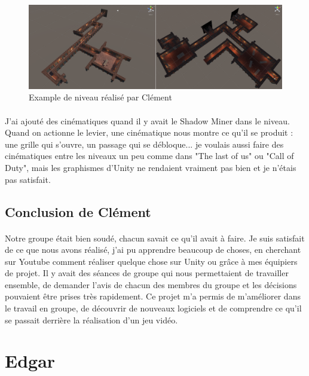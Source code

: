 \documentclass[titlepage, 13px, a4paper]{report}
\begin{document}
\begin{figure}[h!]
  \centering
  \includegraphics[scale=0.4]{images/clement_map_Final.png}
  \caption{Example de niveau réalisé par Clément}
\end{figure}

\paragraph*{} \hspace{0pt}
J'ai ajouté des cinématiques quand il y avait le Shadow Miner dans le niveau. 
Quand on actionne le levier, une cinématique nous montre ce qu'il se produit : une 
grille qui s'ouvre, un passage qui se débloque... je voulais aussi faire des cinématiques 
entre les niveaux un peu comme dans "The last of us" ou "Call of Duty", mais les graphismes 
d'Unity ne rendaient vraiment pas bien et je n'étais pas satisfait. \\

\subsection{Conclusion de Clément}
\paragraph*{} \hspace{0pt}
Notre groupe était bien soudé, chacun savait ce qu'il avait à faire. Je suis satisfait 
de ce que nous avons réalisé, j'ai pu apprendre beaucoup de choses, en cherchant sur 
Youtube comment réaliser quelque chose sur Unity ou grâce à mes équipiers de projet. 
Il y avait des séances de groupe qui nous permettaient de travailler ensemble, de demander 
l'avis de chacun des membres du groupe et les décisions pouvaient être prises très rapidement. 
Ce projet m'a permis de m'améliorer dans le travail en groupe, de découvrir de nouveaux 
logiciels et de comprendre ce qu'il se passait derrière la réalisation d'un jeu vidéo.  \

\newpage
\section{Edgar}
\end{document}
